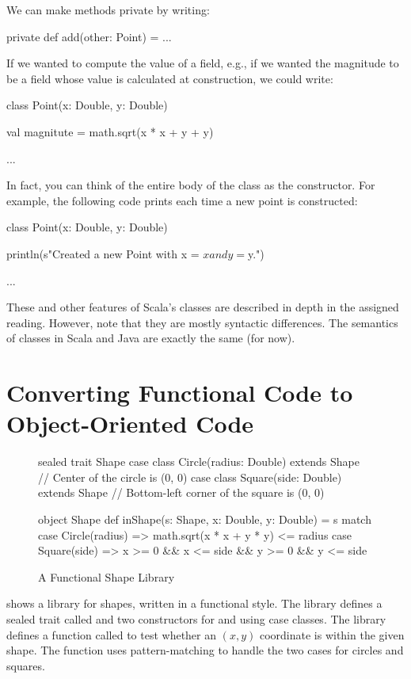 \documentclass[9pt]{extbook}
\begin{document}
We can make methods private by writing:
\begin{scalacode}
private def add(other: Point) = { ... }
\end{scalacode}

If we wanted to compute the value of a field, e.g., if we wanted the magnitude
to be a field whose value is calculated at construction, we could write:
%
\begin{scalacode}
class Point(x: Double, y: Double) {

  val magnitute = math.sqrt(x * x + y + y)

  ...
}
\end{scalacode}

In fact, you can think of the entire body of the class as the constructor.
For example, the following code prints each time a new point is constructed:

%
\begin{scalacode}
class Point(x: Double, y: Double) {

  println(s"Created a new Point with x = $x and y = $y.")

  ...
}
\end{scalacode}

These and other features of Scala's classes are described in depth in the
assigned reading. However, note that they are mostly syntactic differences.
The semantics of classes in Scala and Java are exactly the same (for now).

\section{Converting Functional Code to Object-Oriented Code}

\begin{figure}
\begin{scalacode}
sealed trait Shape
case class Circle(radius: Double) extends Shape // Center of the circle is (0, 0)
case class Square(side: Double) extends Shape // Bottom-left corner of the square is (0, 0)

object Shape {
  def inShape(s: Shape, x: Double, y: Double) = s match {
    case Circle(radius) => math.sqrt(x * x + y * y) <= radius
    case Square(side) => x >= 0 && x <= side && y >= 0 && y <= side
  }
}
\end{scalacode}
\caption{A Functional Shape Library}
\label{fshapes1}
\end{figure}

 shows a library for shapes, written in a functional style.
The library defines a sealed trait called  and two
constructors for  and  using
case classes. The library defines a function called 
to test whether an $(x,y)$ coordinate is within the given shape. The function
uses pattern-matching to handle the two cases for circles and squares.
\end{document}
